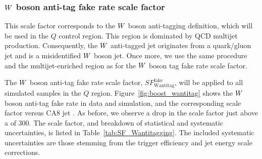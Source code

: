 
\subsubsection{\texorpdfstring{$W$}{W} boson anti-tag fake rate scale factor
\label{sec:wantitag_fake_sf}}

This scale factor corresponds to the $W$ boson anti-tagging definition, which will be used in the
$Q$ control region. This region is dominated by QCD multijet production. Consequently, the $W$
anti-tagged jet originates from a quark/gluon jet and is a misidentified $W$ boson jet. Once
more, we use the same procedure and the multijet-enriched region as for the $W$ boson tag fake
rate scale factor.

The $W$ boson anti-tag fake rate scale factor, $SF_\textrm{Wantitag}^\textrm{fake}$, will be
applied to all simulated samples in the $Q$ region. 
Figure~\ref{fig:boost_wantitag} shows the $W$ boson anti-tag fake rate in data and
simulation, and the corresponding scale factor versus CA8 jet \pt. As before, we observe a drop in
the scale factor just above a \pt of 300\GeV. The scale factor, and breakdown of statistical and
systematic uncertainties, is listed in Table~\ref{tab:SF_Wantitagging}. The included systematic
uncertainties are those stemming from the trigger efficiency and jet energy scale corrections. 


